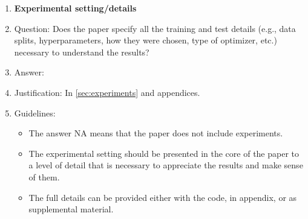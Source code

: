 \documentclass{article}
\begin{document}
\begin{enumerate}
\item {\bf Experimental setting/details}
    \item[] Question: Does the paper specify all the training and test details (e.g., data splits, hyperparameters, how they were chosen, type of optimizer, etc.) necessary to understand the results?
    \item[] Answer: \answerYes{} %
    \item[] Justification: In \cref{sec:experiments} and appendices.
    \item[] Guidelines:
    \begin{itemize}
        \item The answer NA means that the paper does not include experiments.
        \item The experimental setting should be presented in the core of the paper to a level of detail that is necessary to appreciate the results and make sense of them.
        \item The full details can be provided either with the code, in appendix, or as supplemental material.
    \end{itemize}


\end{enumerate}
\end{document}
